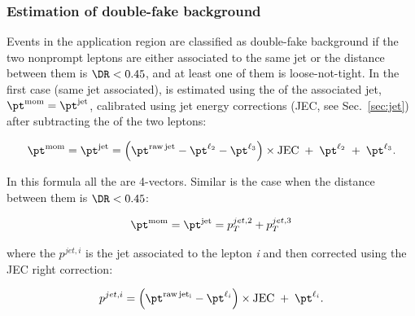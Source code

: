 \subsubsection{Estimation of double-fake background}
\label{sec:doubleFakeBkg}

Events in the application region are classified as double-fake
background if the two nonprompt leptons are either associated to the same
jet or the distance between them is $\DR<0.45$, and at least one of them is loose-not-tight.
In the first case (same jet associated), \ptm is estimated using the \pt of the associated
jet, $\ptm=\ptj$, calibrated using jet energy corrections (JEC, see
Sec.~\ref{sec:jet}) after subtracting the \pt of the two leptons:
\begin{linenomath}
  \begin{equation}
    \label{eq:ptjet}
    \ptm = \ptj =
    \left(\pt^{\mathrm{raw\,jet}}-\pt^{\ltwo}-\pt^{\lthree}\right)\times\mathrm{JEC}
    \;+\; \pt^{\ltwo} \;+\; \pt^{\lthree}.
  \end{equation}
\end{linenomath}
In this formula all the \pt are 4-vectors.
Similar is the case when the distance between them is $\DR<0.45$:
\begin{linenomath}
  \begin{equation}
    \label{eq:ptjet_45}
    \ptm = \ptj = p^{jet,2}_T + p^{jet,3}_T 
  \end{equation}
\end{linenomath}
where the $p^{jet,i}$ is the jet associated to the lepton \emph{i} and then corrected using the JEC right correction:
\begin{linenomath}
  \begin{equation}
    \label{eq:ptjet_45_single}
    p^{jet,i} = \left(\pt^{\mathrm{raw\,jet_i}}-\pt^{\ell_{i}}\right)\times\mathrm{JEC}\;+\; \pt^{\ell_i} .
  \end{equation}
\end{linenomath}

